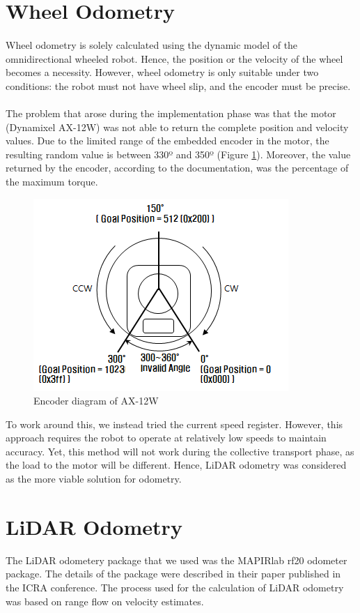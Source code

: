 \newpage
\section*{Wheel Odometry}
\paragraph*{}
\quad Wheel odometry is solely calculated using the dynamic model of the omnidirectional wheeled robot. Hence, the position or the velocity of the wheel becomes a necessity. However, wheel odometry is only suitable under two conditions: the robot must not have wheel slip, and the encoder must be precise. 
\paragraph*{}
The problem that arose during the implementation phase was that the motor (Dynamixel AX-12W) was not able to return the complete position and velocity values. Due to the limited range of the embedded encoder in the motor, the resulting random value is between 330º and 350º (Figure \ref{fig:goal-position}). Moreover, the value returned by the encoder, according to the documentation, was the percentage of the maximum torque. \cite{robotisAX12W} 

\begin{figure}[H]
    \centering
    \includegraphics[width=0.35\linewidth]{assets/images/odometry/goal_position.png}
    \caption{Encoder diagram of AX-12W}
    \label{fig:goal-position}
\end{figure}

To work around this, we instead tried the current speed register. However, this approach requires the robot to operate at relatively low speeds to maintain accuracy. Yet, this method will not work during the collective transport phase, as the load to the motor will be different. Hence, LiDAR odometry was considered as the more viable solution for odometry.

\newpage
\section*{LiDAR Odometry}
The LiDAR odometery package that we used was the MAPIRlab rf20 odometer package. The details of the package were described in their paper published in the ICRA conference. The process used for the calculation of LiDAR odometry was based on range flow on velocity estimates. 

